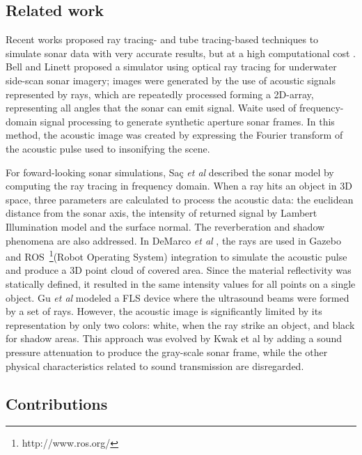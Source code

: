 \documentclass[final,5p,times]{elsarticle}
\begin{document}
\subsection{Related work}
\label{relatedworks}

Recent works proposed ray tracing- and tube tracing-based techniques to simulate sonar data with very accurate results, but at a high computational cost \cite{bell1997,waite2002,sac2015,demarco2015,gu2013,kwak2015,cerqueira2016}. Bell and Linett \cite{bell1997} proposed a simulator using optical ray tracing for underwater side-scan sonar imagery; images were generated by the use of acoustic signals represented by rays, which are repeatedly processed forming a 2D-array, representing all angles that the sonar can emit signal. Waite \cite{waite2002} used of frequency-domain signal processing to generate synthetic aperture sonar frames. In this method, the acoustic image was created by expressing the Fourier transform of the acoustic pulse used to insonifying the scene.

For foward-looking sonar simulations, Saç \textit{et al} \cite{sac2015} described the sonar model by computing the ray tracing in frequency domain. When a ray hits an object in 3D space, three parameters are calculated to process the acoustic data: the euclidean distance from the sonar axis, the intensity of returned signal by Lambert Illumination model and the surface normal. The reverberation and shadow phenomena are also addressed. In DeMarco \textit{et al} \cite{demarco2015}, the rays are used in Gazebo and ROS~\footnote{http://www.ros.org/}(Robot Operating System) integration to simulate the acoustic pulse and produce a 3D point cloud of covered area. Since the material reflectivity was statically defined, it resulted in the same intensity values for all points on a single object. Gu \textit{et al} \cite{gu2013} modeled a FLS device where the ultrasound beams were formed by a set of rays. However, the acoustic image is significantly limited by its representation by only two colors: white, when the ray strike an object, and black for shadow areas. This approach was evolved by Kwak et al \cite{kwak2015} by adding a sound pressure attenuation to produce the gray-scale sonar frame, while the other physical characteristics related to sound transmission are disregarded.

\subsection{Contributions}
\end{document}

